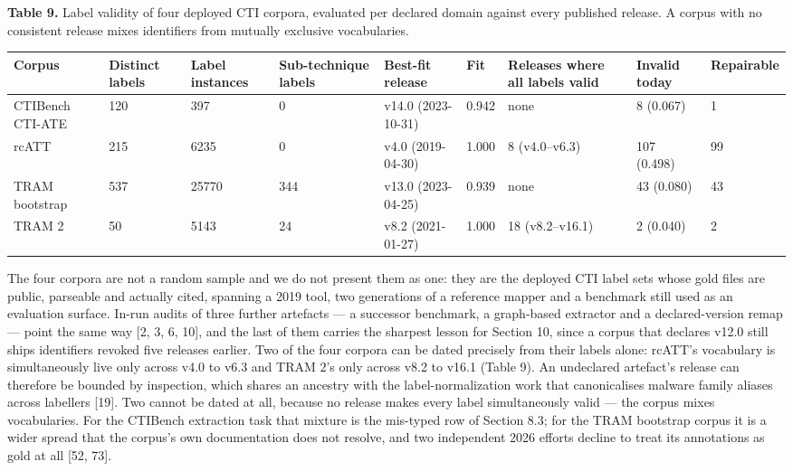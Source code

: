 \documentclass[11pt,a4paper]{article}
\begin{document}
\textbf{Table 9.} Label validity of four deployed CTI corpora, evaluated per declared domain against every published release. A corpus with no consistent release mixes identifiers from mutually exclusive vocabularies.

\begin{center}\footnotesize
\begin{tabular}{lllllllll}
\toprule
Corpus & Distinct labels & Label instances & Sub-technique labels & Best-fit release & Fit & Releases where all labels valid & Invalid today & Repairable \\
\midrule
CTIBench CTI-ATE & 120 & 397 & 0 & v14.0 (2023-10-31) & 0.942 & none & 8 (0.067) & 1 \\
rcATT & 215 & 6235 & 0 & v4.0 (2019-04-30) & 1.000 & 8 (v4.0–v6.3) & 107 (0.498) & 99 \\
TRAM bootstrap & 537 & 25770 & 344 & v13.0 (2023-04-25) & 0.939 & none & 43 (0.080) & 43 \\
TRAM 2 & 50 & 5143 & 24 & v8.2 (2021-01-27) & 1.000 & 18 (v8.2–v16.1) & 2 (0.040) & 2 \\
\bottomrule
\end{tabular}
\end{center}

The four corpora are not a random sample and we do not present them as one: they are the deployed CTI label sets whose gold files are public, parseable and actually cited, spanning a 2019 tool, two generations of a reference mapper and a benchmark still used as an evaluation surface. In-run audits of three further artefacts — a successor benchmark, a graph-based extractor and a declared-version remap — point the same way [2, 3, 6, 10], and the last of them carries the sharpest lesson for Section 10, since a corpus that declares v12.0 still ships identifiers revoked five releases earlier. Two of the four corpora can be dated precisely from their labels alone: rcATT's vocabulary is simultaneously live only across v4.0 to v6.3 and TRAM 2's only across v8.2 to v16.1 (Table 9). An undeclared artefact's release can therefore be bounded by inspection, which shares an ancestry with the label-normalization work that canonicalises malware family aliases across labellers [19]. Two cannot be dated at all, because no release makes every label simultaneously valid — the corpus mixes vocabularies. For the CTIBench extraction task that mixture is the mis-typed row of Section 8.3; for the TRAM bootstrap corpus it is a wider spread that the corpus's own documentation does not resolve, and two independent 2026 efforts decline to treat its annotations as gold at all [52, 73].
\end{document}

